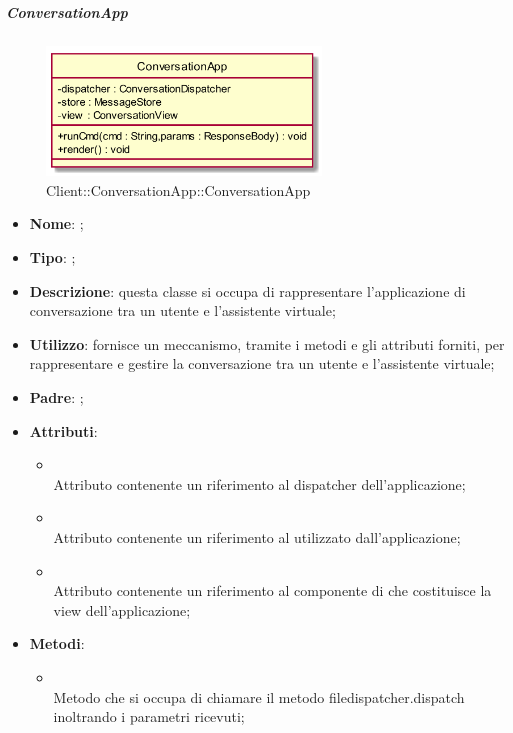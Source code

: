 \hypertarget{ConversationApp_label}{\subparagraph{ConversationApp}}
\begin{figure}[h]
	\centering
	\includegraphics[width=0.65\textwidth,height=\textheight,keepaspectratio]{images/ClassConversationApp.png}
	\caption{Client::ConversationApp::ConversationApp}
\end{figure}
\begin{itemize}
	\item \textbf{Nome}: ;
	\item \textbf{Tipo}: ;
	\item \textbf{Descrizione}: questa classe si occupa di rappresentare l'applicazione di conversazione tra un utente e l'assistente virtuale;
	\item \textbf{Utilizzo}: fornisce un meccanismo, tramite i metodi e gli attributi forniti, per rappresentare e gestire la conversazione tra un utente e l'assistente virtuale;
	\item \textbf{Padre}: ;
	\item \textbf{Attributi}:
	\begin{itemize}
		\item[]  \\
		Attributo contenente un riferimento al dispatcher dell'applicazione;
		\item[]  \\
		Attributo contenente un riferimento al  utilizzato dall'applicazione;
		\item[]  \\
		Attributo contenente un riferimento al componente di  che costituisce la view dell'applicazione;
	\end{itemize}
	\item \textbf{Metodi}:
	\begin{itemize}
		\item[]  \\		Metodo che si occupa di chiamare il metodo file{dispatcher.dispatch} inoltrando i parametri ricevuti;\\

\end{itemize}
\end{itemize}
